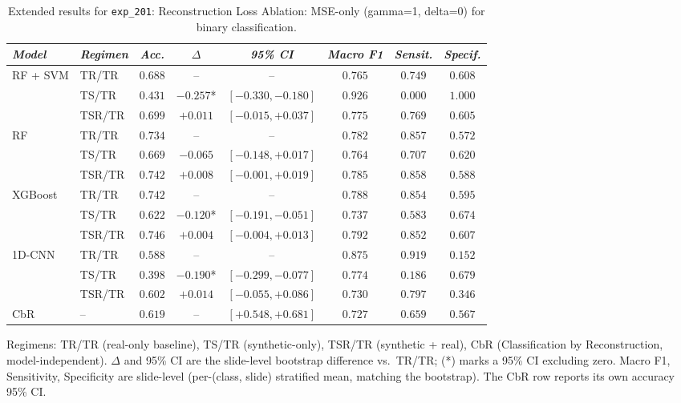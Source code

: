\begin{table}[htp]
\centering
\scriptsize
\caption{Extended results for \texttt{exp\_201}: Reconstruction Loss Ablation: MSE-only (gamma=1, delta=0) for binary classification.}
\label{tab:appendix_exp_201}
\begin{tabular*}{\textwidth}{@{\extracolsep{\fill}}llcccccc}
\toprule
\emph{Model} & \emph{Regimen} & \emph{Acc.} & \emph{$\Delta$} & \emph{95\% CI} & \emph{Macro F1} & \emph{Sensit.} & \emph{Specif.}\\
\midrule
\multirow{3}{*}{RF + SVM} & TR/TR & $0.688$ & -- & -- & $0.765$ & $0.749$ & $0.608$\\
 & TS/TR & $0.431$ & $-0.257$* & $[-0.330, -0.180]$ & $0.926$ & $0.000$ & $1.000$\\
 & TSR/TR & $0.699$ & $+0.011$ & $[-0.015, +0.037]$ & $0.775$ & $0.769$ & $0.605$\\
\midrule
\multirow{3}{*}{RF} & TR/TR & $0.734$ & -- & -- & $0.782$ & $0.857$ & $0.572$\\
 & TS/TR & $0.669$ & $-0.065$ & $[-0.148, +0.017]$ & $0.764$ & $0.707$ & $0.620$\\
 & TSR/TR & $0.742$ & $+0.008$ & $[-0.001, +0.019]$ & $0.785$ & $0.858$ & $0.588$\\
\midrule
\multirow{3}{*}{XGBoost} & TR/TR & $0.742$ & -- & -- & $0.788$ & $0.854$ & $0.595$\\
 & TS/TR & $0.622$ & $-0.120$* & $[-0.191, -0.051]$ & $0.737$ & $0.583$ & $0.674$\\
 & TSR/TR & $0.746$ & $+0.004$ & $[-0.004, +0.013]$ & $0.792$ & $0.852$ & $0.607$\\
\midrule
\multirow{3}{*}{1D-CNN} & TR/TR & $0.588$ & -- & -- & $0.875$ & $0.919$ & $0.152$\\
 & TS/TR & $0.398$ & $-0.190$* & $[-0.299, -0.077]$ & $0.774$ & $0.186$ & $0.679$\\
 & TSR/TR & $0.602$ & $+0.014$ & $[-0.055, +0.086]$ & $0.730$ & $0.797$ & $0.346$\\
\midrule
CbR & -- & $0.619$ & -- & $[+0.548, +0.681]$ & $0.727$ & $0.659$ & $0.567$\\
\bottomrule
\end{tabular*}
\small{Regimens: TR/TR (real-only baseline), TS/TR (synthetic-only), TSR/TR (synthetic + real), CbR (Classification by Reconstruction, model-independent). $\Delta$ and 95\% CI are the slide-level bootstrap difference vs.\ TR/TR; (*) marks a 95\% CI excluding zero. Macro F1, Sensitivity, Specificity are slide-level (per-(class, slide) stratified mean, matching the bootstrap). The CbR row reports its own accuracy 95\% CI.}
\end{table}

